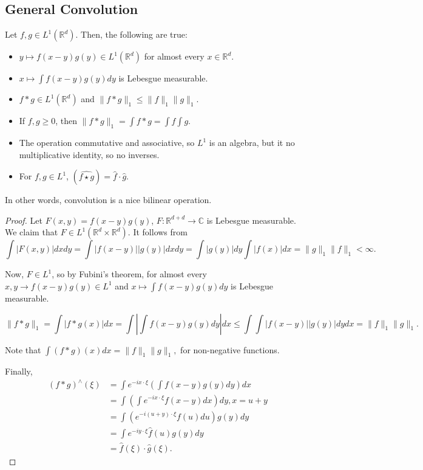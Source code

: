 \documentclass[11pt]{scrartcl}
\newcommand{\R}{\mathbb{R}}
\newcommand{\C}{\mathbb C}
\let \hat \widehat
\newcommand{\<}{\langle}
\renewcommand{\>}{\rangle}
\begin{document}
\subsection{General Convolution}
\begin{thm} Let $f, g \in L^1(\R^d)$.  Then, the following are true:
\begin{itemize}
\item $y \mapsto f(x-y)g(y) \in L^1(\R^d)$ for almost every $x \in \R^d$.
\item $x \mapsto \int f(x-y)g(y) dy$ is Lebesgue measurable.
\item $f * g \in L^1(\R^d)$ and $\|f * g\|_1 \le \|f\|_1 \|g\|_1$.
\item If $f, g \ge 0$, then $\|f * g\|_1 = \int f * g = \int f \int g$.
\item The operation commutative and associative, so $L^1$ is an algebra, but it no multiplicative identity, so no inverses.
\item For $f, g \in L^1$, $(\widehat{f \star g}) = \widehat{f}\cdot\widehat{g}$.
\end{itemize}
In other words, convolution is a nice bilinear operation.
\end{thm}
\begin{proof}
Let $F(x, y) = f(x-y)g(y)$, $F : \R^{d+d} \rightarrow \C$ is Lebesgue measurable. We claim that $F \in L^1(\R^d \times \R^d)$. It follows from  
$$\int |F(x, y)|dxdy = \int |f(x-y)| |g(y)| dx dy = \int |g(y)| dy  \int |f(x)|dx = \|g\|_1\|f\|_1 < \infty.$$

Now, $F \in L^1$, so by Fubini's theorem, for almost every $x, y \rightarrow f(x-y)g(y) \in L^1$ and $x \mapsto \int f(x-y)g(y) dy$ is Lebesgue measurable.

$$ \|f* g\|_1=\int |f*g(x)|dx = \int \left |\int f(x-y)g(y)dy\right |dx \le \int \int |f(x-y)||g(y)|dy dx = \|f\|_1\|g\|_1.$$

Note that $\int (f * g)(x)dx = \|f\|_1\|g\|_1,$ for non-negative functions.

Finally, 
\begin{align*}
(f*g)^\wedge (\xi) &= \int e^{-ix \cdot \xi} \left (\int f(x-y)g(y)dy\right)dx \\
&= \int \left (\int e^{-ix\cdot \xi}f(x-y)dx\right ) dy, x = u+y\\
&= \int \left (e^{-i(u+y)\cdot \xi}f(u)du\right)g(y)dy \\
&= \int e^{-iy\cdot \xi} \hat{f}(u)g(y)dy\\
&= \hat{f}(\xi) \cdot \hat{g}(\xi).
\end{align*}
\end{proof}
\end{document}
